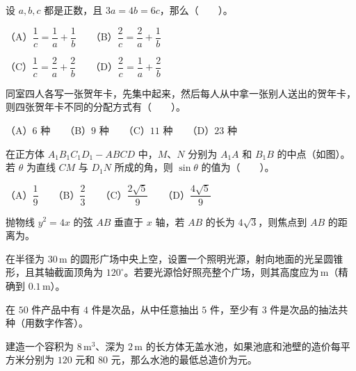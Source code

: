 \begin{question}
设 $a,b,c$ 都是正数，且 $3a=4b=6c$，那么\mbox{（　　）}。

（A）$\dfrac1c=\dfrac1a+\dfrac1b$　　（B）$\dfrac2c=\dfrac2a+\dfrac1b$\par\vspace*{3pt}

（C）$\dfrac1c=\dfrac2a+\dfrac2b$　　（D）$\dfrac2c=\dfrac1a+\dfrac2b$

\end{question}
\begin{question}
同室四人各写一张贺年卡，先集中起来，然后每人从中拿一张别人送出的贺年卡，则四张贺年卡不同的分配方式有\mbox{（　　）}。

（A）$6$ 种　　（B）$9$ 种　　（C）$11$ 种　　（D）$23$ 种

\Needspace{0.4\textheight}
\end{question}
\begin{question}
在正方体 $A_1B_1C_1D_1-ABCD$ 中，$M\text{、}N$ 分别为 $A_1A$ 和 $B_1B$ 的中点（如图）。若 $\theta$ 为直线 $CM$ 与 $D_1N$ 所成的角，则 $\sin\theta$ 的值为\mbox{（　　）}。
\nopagebreak[4]
\begin{center}\end{center}
\nopagebreak[4]
（A）$\dfrac19$　　（B）$\dfrac23$　　（C）$\dfrac{2\sqrt5}{9}$　　（D）$\dfrac{4\sqrt5}{9}$

\end{question}
\begin{question}
抛物线 $y^2=4x$ 的弦 $AB$ 垂直于 $x$ 轴，若 $AB$ 的长为 $4\sqrt3$，则焦点到 $AB$ 的距离为\underline{\qquad\qquad}。

\end{question}
\begin{question}
在半径为 $30\,\mathrm m$ 的圆形广场中央上空，设置一个照明光源，射向地面的光呈圆锥形，且其轴截面顶角为 $120^\circ$。若要光源恰好照亮整个广场，则其高度应为\underline{\qquad\qquad}$\,\mathrm m$（精确到 $0.1\,\mathrm m$）。

\end{question}
\begin{question}
在 $50$ 件产品中有 $4$ 件是次品，从中任意抽出 $5$ 件，至少有 $3$ 件是次品的抽法共\underline{\qquad\qquad}种（用数字作答）。

\end{question}
\begin{question}
建造一个容积为 $8\,\mathrm m^3$、深为 $2\,\mathrm m$ 的长方体无盖水池，如果池底和池壁的造价每平方米分别为 $120$ 元和 $80$ 元，那么水池的最低总造价为\underline{\qquad\qquad}元。

\end{question}
